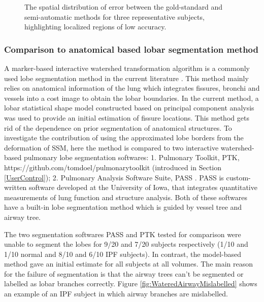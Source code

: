 {\begin{figure}[htbp]
\begin{subfigure}{.38 \linewidth}
  \caption{}
  \label{fig:QuanlititativeResult-c} 
\end{subfigure}
\caption{The spatial distribution of error between the gold-standard and semi-automatic methods for three representative subjects, highlighting localized regions of low accuracy.}
\label{fig:QuanlititativeResult}
\end{figure}

\subsubsection{Comparison to anatomical based lobar segmentation method}
A marker-based interactive watershed transformation algorithm is a commonly used lobe segmentation method in the current literature \citep{ukil2009anatomy,pu2009pulmonary,lassen2011interactive,lassen2013automatic}. This method mainly relies on anatomical information of the lung which integrates fissures, bronchi and vessels into a cost image to obtain the lobar boundaries. In the current method, a lobar statistical shape model constructed based on principal component analysis was used to provide an initial estimation of fissure locations. This method gets rid of the dependence on prior segmentation of anatomical structures. To investigate the contribution of using the approximated lobe borders from the deformation of SSM, here the method is compared to two interactive watershed-based pulmonary lobe segmentation softwares: 1. Pulmonary Toolkit, PTK, https://github.com/tomdoel/pulmonarytoolkit (introduced in Section \ref{UserControl}); 2. Pulmonary Analysis Software Suite, PASS \citep{guo2008pulmonary}. PASS is custom-written software developed at the University of Iowa, that integrates quantitative measurements of lung function and structure analysis. Both of these softwares have a built-in lobe segmentation method which is guided by vessel tree and airway tree.

The two segmentation softwares PASS and PTK tested for comparison were unable to segment the lobes for 9/20 and 7/20 subjects respectively (1/10 and 1/10 normal and 8/10 and 6/10 IPF subjects). In contrast, the model-based method gave an initial estimate for all subjects at all volumes. The main reason for the failure of segmentation is that the airway trees can't be segmented or labelled as lobar branches correctly. Figure \ref{fig:WateredAirwayMislabelled} shows an example of an IPF subject in which airway branches are mislabelled. 

}

